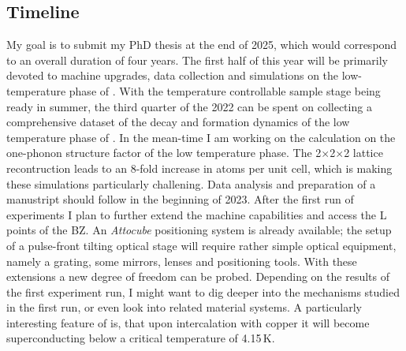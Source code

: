 \subsection*{Timeline}
My goal is to submit my PhD thesis at the end of 2025, which would correspond to an overall duration of four years.
The first half of this year will be primarily devoted to machine upgrades, data collection and simulations on the low-temperature phase of \ts.
With the temperature controllable sample stage being ready in summer, the third quarter of the 2022 can be spent on collecting a comprehensive dataset of the decay and formation dynamics of the low temperature phase of \ts.
In the mean-time I am working on the calculation on the one-phonon structure factor of the low temperature phase.
The 2$\times$2$\times$2 lattice recontruction leads to an 8-fold increase in atoms per unit cell, which is making these simulations particularly challening.
Data analysis and preparation of a manustript should follow in the beginning of 2023.
After the first run of experiments I plan to further extend the machine capabilities and access the L points of the \ac{BZ}.
An \emph{Attocube} positioning system is already available; the setup of a pulse-front tilting optical stage will require rather simple optical equipment, namely a grating, some mirrors, lenses and positioning tools.
With these extensions a new degree of freedom can be probed.
Depending on the results of the first experiment run, I might want to dig deeper into the mechanisms studied in the first run, or even look into related material systems.
A particularly interesting feature of \ts\space is, that upon intercalation with copper it will become superconducting below a critical temperature of 4.15\,K\cite{morosan2006}.

